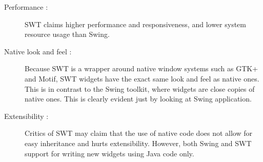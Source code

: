 \begin{description}
\item[Performance :] SWT claims higher performance and responsiveness, and lower system resource usage than Swing.

\item[Native look and feel :] Because SWT is a wrapper around native window systems such as GTK+ and Motif, SWT widgets have the exact same look and feel as native ones. This is in contrast to the Swing toolkit, where widgets are close copies of native ones. This is clearly evident just by looking at Swing application.

\item[Extensibility :] Critics of SWT may claim that the use of native code does not allow for easy inheritance and hurts extensibility. However, both Swing and SWT support for writing new widgets using Java code only.
\end{description}
